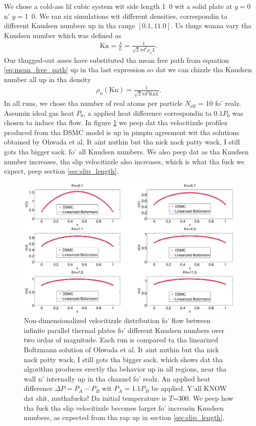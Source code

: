 We chose a cold-ass lil cubic system wit side length \unit{1.0}{\micro\meter} wit a solid plate at $y=$\unit{0}{\micro\meter} n' $y=$\unit{1.0}{\micro\meter}. We ran six simulations wit different densities, correspondin ta different Knudsen numbers up in tha range $[0.1, 11.0]$. Us thugs wanna vary tha Knudsen number which was defined as
\begin{align}
	\text{Kn} = \frac{\lambda}{L} = \frac{1}{\sqrt 2 \pi d^2 \rho_n L}.
\end{align}
Our thugged-out asses have substituted tha mean free path from equation \eqref{eq:mean_free_path} up in tha last expression so dat we can chizzle tha Knudsen number all up in tha density
\begin{align}
	\rho_n(\text{Kn}) = \frac{1}{\sqrt 2 \pi d^2 \text{Kn}L}.
\end{align}
In all runs, we chose tha number of real atoms per particle $N_\text{eff}$ = 10 fo' realz. Assumin ideal gas heat $P_0$, a applied heat difference correspondin ta $0.1P_0$ was chosen ta induce tha flow. In figure \ref{fig:dsmc_validation_poiseuille} we peep dat tha velocitizzle profilez produced from tha DSMC model is up in pimpin agreement wit tha solutions obtained by Ohwada et al. It aint nuthin but tha nick nack patty wack, I still gots tha bigger sack. fo' all Knudsen numbers. We also peep dat as tha Knudsen number increases, tha slip velocitizzle also increases, which is what tha fuck we expect, peep section \ref{sec:slip_length}.
\begin{figure}[htpb]
\includegraphics[width=\textwidth, trim=6cm 0cm 5cm 0cm, clip]{DSMC/figures/validation_poiseuille.eps}
\centering
\caption{Non-dimensionalized velocitizzle distribution fo' flow between infinite parallel thermal plates fo' different Knudsen numbers over two ordaz of magnitude. Each run is compared ta tha linearized Boltzmann solution of Ohwada et al. It aint nuthin but tha nick nack patty wack, I still gots tha bigger sack. \cite{ohwada1989numerical} which shows dat tha algorithm produces erectly tha behavior up in all regions, near tha wall n' internally up in tha channel fo' realz. An applied heat difference $\Delta P = P_A - P_B$ wit $P_A = 1.1P_B$ be applied. Y'all KNOW dat shit, muthafucka! Da initial temperature is $T$=\unit{300}{\kelvin}. We peep how tha fuck tha slip velocitizzle becomes larger fo' increasin Knudsen numbers, as expected from tha rap up in section \ref{sec:slip_length}. }
\label{fig:dsmc_validation_poiseuille}
\end{figure}